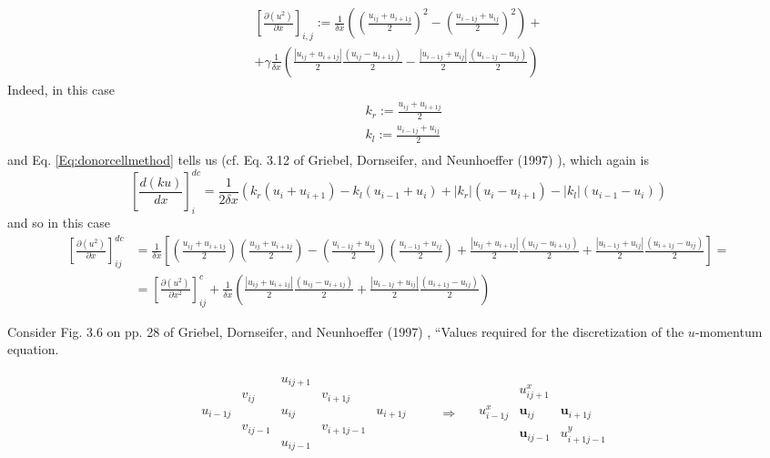 \documentclass[10pt]{amsart}
\begin{document}
\begin{multicols*}{2}
\begin{equation}
  \begin{gathered}
    \left[ \frac{ \partial (u^2) }{ \partial x } \right]_{i,j}  := \frac{1}{\delta x} \left( \left( \frac{ u_{ij} + u_{i+1j}}{2} \right)^2 - \left( \frac{ u_{i-1j} + u_{ij}}{2} \right)^2 \right) +  \\
    + \gamma \frac{1}{\delta x} \left( \frac{ |u_{ij} + u_{i+1j } |}{2} \frac{ (u_{ij} - u_{i+1j} ) }{2} - \frac{ |u_{i-1j} + u_{ij} | }{2} \frac{ (u_{i-1j } -u_{ij} )}{2} \right) 
    \end{gathered}
  \end{equation}
Indeed, in this case
\[
\begin{aligned}
  & k_r := \frac{u_{ij} + u_{i+1j} }{2} \\ 
  & k_l := \frac{u_{i-1j} + u_{ij} }{2} \\ 
  \end{aligned}
\]
and Eq. \ref{Eq:donorcellmethod} tells us (cf. Eq. 3.12 of Griebel, Dornseifer, and Neunhoeffer (1997) \cite{GDN1997}), which again is
\[
\left[ \frac{d(ku)}{dx} \right]_i^{dc}  = \frac{1}{2\delta x} (k_r (u_i + u_{i+1} ) - k_l (u_{i-1} + u_i ) + |k_r| (u_i - u_{i+1}) - |k_l|(u_{i-1} - u_i ) )
\]
and so in this case
{\small
\[
\begin{aligned}
  \left[ \frac{ \partial (u^2)}{ \partial x} \right]^{dc}_{ij} & = \frac{1}{\delta x} \left[ \left( \frac{ u_{ij} + u_{i+1j} }{2} \right)\left( \frac{u_{ij} + u_{i+1j}}{2} \right) - \left( \frac{u_{i-1j} + u_{ij} }{2} \right)\left( \frac{u_{i-1j} + u_{ij} }{2} \right)  + \frac{ |u_{ij} + u_{i+1j} | }{2} \frac{ (u_{ij} - u_{i+1j} )}{2} + \frac{ |u_{i-1j} +u_{ij} |}{2} \frac{(u_{i+1j}-u_{ij} )}{2} \right] = \\
  & = \left[ \frac{ \partial (u^2)}{ \partial x^2} \right]^c_{ij} + \frac{1}{\delta x} \left( \frac{ |u_{ij} + u_{i+1j} | }{2} \frac{ (u_{ij} - u_{i+1j} )}{2} + \frac{ |u_{i-1j} +u_{ij} |}{2} \frac{(u_{i+1j}-u_{ij} )}{2} \right)
\end{aligned}
\]
}

Consider Fig. 3.6 on pp. 28 of Griebel, Dornseifer, and Neunhoeffer (1997) \cite{GDN1997}, ``Values required for the discretization of the $u$-momentum equation.

\[
\begin{aligned}
& \begin{matrix}
    & & u_{ij+1} & & \\
    & v_{ij} &  & v_{i+1j} &  \\
u_{i-1j} &         & u_{ij}  &          &  u_{i+1j} \\     
& v_{ij-1} &        & v_{i+1j-1} &         \\
&         & u_{ij-1} &          & 
  \end{matrix} \qquad \, \Longrightarrow \quad \, 
  \begin{matrix}
          & u^x_{ij+1}       &      \\
u^x_{i-1j} & \mathbf{u}_{ij} & \mathbf{u}_{i+1j} \\ 
         & \mathbf{u}_{ij-1} & u^y_{i+1j-1} 
  \end{matrix}
  \end{aligned}
\]


\end{multicols*}
\end{document}
